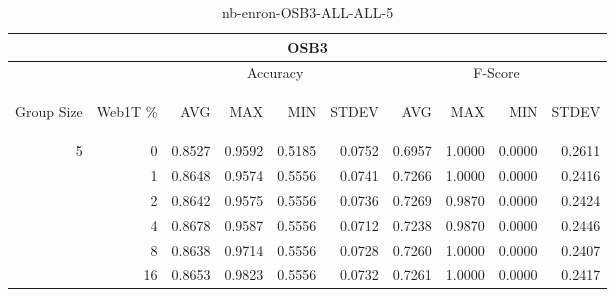 \begin{center}
\begin{table}[htbp]
\begin{tabular}{ | r | r | r | r | r | r | r | r | r | r |}
\hline
\multicolumn{10}{|c|}{OSB3}\\
\hline
 & & \multicolumn{4}{|c|}{Accuracy} & \multicolumn{4}{|c|}{F-Score}\\ \cline{3-10}
\begin{sideways}Group Size\end{sideways} & \begin{sideways}Web1T \%\end{sideways} & \begin{sideways}AVG\end{sideways} & \begin{sideways}MAX\end{sideways} & \begin{sideways}MIN\end{sideways} & \begin{sideways}STDEV\end{sideways} & \begin{sideways}AVG\end{sideways} & \begin{sideways}MAX\end{sideways} & \begin{sideways}MIN\end{sideways} & \begin{sideways}STDEV\end{sideways}\\
\hline
\multirow{5}{*}{5}
 & 0 & 0.8527 & 0.9592 & 0.5185 & 0.0752 & 0.6957 & 1.0000 & 0.0000 & 0.2611\\ \cline{2-10}
 & 1 & 0.8648 & 0.9574 & 0.5556 & 0.0741 & 0.7266 & 1.0000 & 0.0000 & 0.2416\\ \cline{2-10}
 & 2 & 0.8642 & 0.9575 & 0.5556 & 0.0736 & 0.7269 & 0.9870 & 0.0000 & 0.2424\\ \cline{2-10}
 & 4 & 0.8678 & 0.9587 & 0.5556 & 0.0712 & 0.7238 & 0.9870 & 0.0000 & 0.2446\\ \cline{2-10}
 & 8 & 0.8638 & 0.9714 & 0.5556 & 0.0728 & 0.7260 & 1.0000 & 0.0000 & 0.2407\\ \cline{2-10}
 & 16 & 0.8653 & 0.9823 & 0.5556 & 0.0732 & 0.7261 & 1.0000 & 0.0000 & 0.2417\\ \cline{2-10}
\hline
\end{tabular}
\caption{nb-enron-OSB3-ALL-ALL-5}
\label{table:nb-enron-OSB3-ALL-ALL-5}
\end{table}
\end{center}

